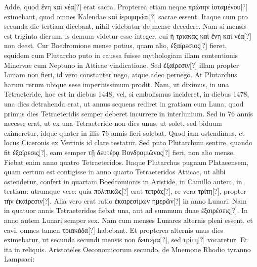 Adde, quod
\textgreek{ἔνη καὶ νέα[?]} erat sacra.
Propterea etiam neque \textgreek{πρώτην ἱσταμένου[?]} eximebant,
quod omnes Kalendae \textgreek{καὶ ἱερομηνίαι[?]} sacrae essent.
Itaque cum pro secunda
die tertiam dicebant, nihil videbatur de mense decedere.
Nam si
mensis est triginta dierum, is demum videtur esse integer,
 cui \textgreek{ἡ τριακὰς
καὶ ἔνη καὶ νέα[?]} non deest.
Cur Boedromione mense potius, quam alio,
\textgreek{ἐξαίρεσιος[?]} fieret, equidem cum Plutarcho puto in caussa
 fuisse mythologiam
illam contentionis Minervae cum Neptuno in Atticae vindicatione.
Sed \textgreek{ἐξαίρεσιν[?]} illam propter Lunam non fieri,
 id vero constanter
nego, atque adeo pernego.
At Plutarchus harum rerum ubique sese imperitissimum
prodit.
Nam, ut diximus, in una Tetraeteride, hoc est in
diebus 1448, vel, si embolismus incideret, in diebus 1478, una dies detrahenda
erat, ut annus sequens rediret in gratiam cum Luna, quod
primus dies Tetraeteridis semper deberet incurrere in interlunium.
Sed
in 76 annis necesse erat, ut ex una Tetraeteride non dies unus, ut solet,
sed biduum eximeretur, idque quater in illis 76 annis fieri solebat.
Quod
iam ostendimus, et locus Ciceronis ex Verrinis id clare testatur.
Sed
puto Plutarchum sentire, quando fit \textgreek{ἐξαίρεσις[?]},
 eam semper \textgreek{τῇ δευτέρᾳ
Βονδρομιῶνος[?]} fieri, non alio mense.
Fiebat enim anno quatro Tetraeteridos.
Itaque Plutarchus pugnam Plataeensem, quam certum est contigisse
in anno quarto Tetraeteridos Atticae, ut alibi ostendetur, confert
in quartam Boedromionis in Aristide, in Camillo autem, in tertiam:
utrumque vere: quia \textgreek{πολιτικῶς[?]} erat \textgreek{τετρὰς[?]},
 re vera \textgreek{τρίτη[?]}, propter \textgreek{τὴν
ἐκαίρεσιν[?]}.
Alia vero erat ratio \textgreek{ἐκαιρεσίμων ἡμερῶν[?]} in anno Lunari.
Nam in
quatuor annis Tetraeteridos fiebat una,
 aut ad summum duae \textgreek{ἐξαιρέσεις[?]}.
In anno autem Lunari semper sex.
Nam cum menses Lunares alternis
pleni essent, et cavi, omnes tamen \textgreek{τριακάδα[?]} habebant.
Et propterea
alternis unus dies eximebatur, ut secunda secundi mensis non
 \textgreek{δευτέρα[?]},
sed \textgreek{τρίτη[?]} vocaretur.
Et ita in reliquis.
Aristoteles Oeconomicorum secundo,
de Mnemone Rhodio tyranno Lampsaci:
